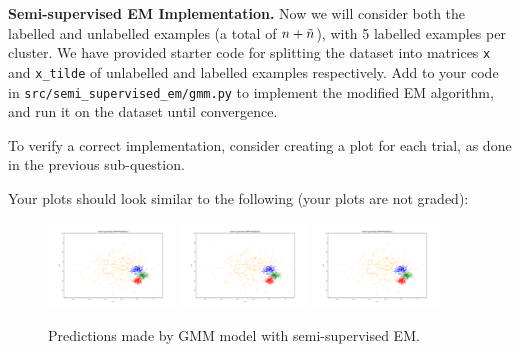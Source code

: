 \item {}
\textbf{Semi-supervised EM Implementation.}
Now we will consider both the labelled and unlabelled examples (a total of ${n} + \tilde{{n}}$), with 5 labelled examples per cluster. We have provided starter code for splitting the dataset into matrices \texttt{x} and \texttt{x\_tilde} of unlabelled and labelled examples respectively. Add to your code in \texttt{src/semi\_supervised\_em/gmm.py} to implement the modified EM algorithm, and run it on the dataset until convergence.

To verify a correct implementation, consider creating a plot for each trial, as done in the previous sub-question.

Your plots should look similar to the following (your plots are not graded):

  \begin{figure}[H]
    \centering
    \includegraphics[width=0.3\textwidth]{02-semi_supervised_em/pred_ss_0.pdf}
    \includegraphics[width=0.3\textwidth]{02-semi_supervised_em/pred_ss_1.pdf}
    \includegraphics[width=0.3\textwidth]{02-semi_supervised_em/pred_ss_2.pdf}
    \caption{Predictions made by GMM model with semi-supervised EM.}
  \end{figure}

